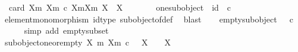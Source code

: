 \begin{isabellebody}
\ \ {\isachardoublequoteopen}card\ {\isacharparenleft}{\kern0pt}{\isacharbraceleft}{\kern0pt}{\isacharparenleft}{\kern0pt}X{\isacharcomma}{\kern0pt}m{\isacharparenright}{\kern0pt}{\isachardot}{\kern0pt}\ {\isacharparenleft}{\kern0pt}X{\isacharcomma}{\kern0pt}m{\isacharparenright}{\kern0pt}\ {\isasymsubseteq}\isactrlsub c\ {\isasymone}{\isacharbraceright}{\kern0pt}{\isacharslash}{\kern0pt}{\isacharslash}{\kern0pt}{\isacharbraceleft}{\kern0pt}{\isacharparenleft}{\kern0pt}{\isacharparenleft}{\kern0pt}X{}{\isacharcomma}{\kern0pt}m{}{\isacharparenright}{\kern0pt}{\isacharcomma}{\kern0pt}{\isacharparenleft}{\kern0pt}X{}{\isacharcomma}{\kern0pt}m{}{\isacharparenright}{\kern0pt}{\isacharparenright}{\kern0pt}{\isachardot}{\kern0pt}\ X{}\ {\isasymcong}\ X{}{\isacharbraceright}{\kern0pt}{\isacharparenright}{\kern0pt}\ {\isacharequal}{\kern0pt}\ {}{\isachardoublequoteclose}\isanewline
%
\isadelimproof
%
\endisadelimproof
%
\isatagproof
{}\isamarkupfalse%
\ {\isacharminus}{\kern0pt}\isanewline
\ \ \isamarkupfalse%
\ one{\isacharunderscore}{\kern0pt}subobject{\isacharcolon}{\kern0pt}\ {\isachardoublequoteopen}{\isacharparenleft}{\kern0pt}{\isasymone}{\isacharcomma}{\kern0pt}\ id\ {\isasymone}{\isacharparenright}{\kern0pt}\ {\isasymsubseteq}\isactrlsub c\ {\isasymone}{\isachardoublequoteclose}\isanewline
\ \ \ \ \isamarkupfalse%
\ element{\isacharunderscore}{\kern0pt}monomorphism\ id{\isacharunderscore}{\kern0pt}type\ subobject{\isacharunderscore}{\kern0pt}of{\isacharunderscore}{\kern0pt}def{}\ \isamarkupfalse%
\ blast\isanewline
\ \ \isamarkupfalse%
\ empty{\isacharunderscore}{\kern0pt}subobject{\isacharcolon}{\kern0pt}\ {\isachardoublequoteopen}{\isacharparenleft}{\kern0pt}{\isasymemptyset}{\isacharcomma}{\kern0pt}\ {\isasymalpha}\isactrlbsub {\isasymone}\isactrlesub {\isacharparenright}{\kern0pt}\ {\isasymsubseteq}\isactrlsub c\ {\isasymone}{\isachardoublequoteclose}\isanewline
\ \ \ \ \isamarkupfalse%
\ {\isacharparenleft}{\kern0pt}simp\ add{\isacharcolon}{\kern0pt}\ empty{\isacharunderscore}{\kern0pt}subset{\isacharparenright}{\kern0pt}\isanewline
\isanewline
\ \ \isamarkupfalse%
\ subobject{\isacharunderscore}{\kern0pt}one{\isacharunderscore}{\kern0pt}or{\isacharunderscore}{\kern0pt}empty{\isacharcolon}{\kern0pt}\ {\isachardoublequoteopen}{\isasymAnd}X\ m{\isachardot}{\kern0pt}\ {\isacharparenleft}{\kern0pt}X{\isacharcomma}{\kern0pt}m{\isacharparenright}{\kern0pt}\ {\isasymsubseteq}\isactrlsub c\ {\isasymone}\ {\isasymLongrightarrow}\ X\ {\isasymcong}\ {\isasymone}\ {\isasymor}\ X\ {\isasymcong}\ {\isasymemptyset}{\isachardoublequoteclose}\isanewline

\end{isabellebody}
